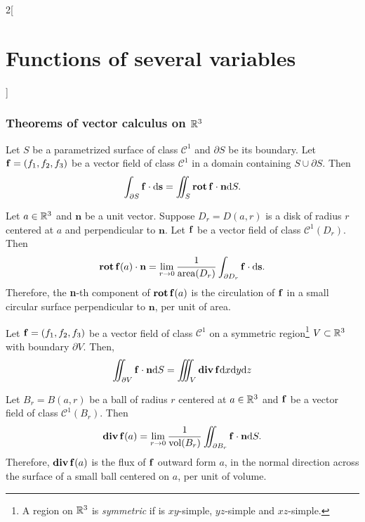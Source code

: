 \documentclass[../../../main.tex]{subfiles}
\begin{document}
\begin{multicols}{2}[\section{Functions of several variables}]
    \subsubsection*{Theorems of vector calculus on \texorpdfstring{$\mathbb{R}^3$}{R3}}
    \begin{theorem}
        Let $S$ be a parametrized surface of class $\mathcal{C}^1$ and $\partial S$ be its boundary. Let $\vb{f}=(f_1,f_2,f_3)$ be a vector field of class $\mathcal{C}^1$ in a domain containing $S\cup\partial S$. Then $$\int_{\partial S}\vb{f}\cdot \dd \textbf{s}=\iint_S\operatorname{\vb{rot}}\vb{f}\cdot\textbf{n} \dd S.$$
    \end{theorem}
    \begin{corollary}
        Let $a\in\mathbb{R}^3$ and $\textbf{n}$ be a unit vector. Suppose $D_r=D(a,r)$ is a disk of radius $r$ centered at $a$ and perpendicular to $\textbf{n}$. Let $\vb{f}$ be a vector field of class $\mathcal{C}^1(D_r)$. Then $$\operatorname{\vb{rot}}\vb{f}(a)\cdot\textbf{n}=\lim_{r\to 0}\frac{1}{\text{area}(D_r)}\int_{\partial D_r}\vb{f}\cdot \dd \textbf{s}.$$ Therefore, the \textbf{n}-th component of $\operatorname{\vb{rot}}\vb{f}(a)$ is the circulation of $\vb{f}$ in a small circular surface perpendicular to $\textbf{n}$, per unit of area.
    \end{corollary}
    \begin{theorem}
        Let $\vb{f}=(f_1,f_2,f_3)$ be a vector field of class $\mathcal{C}^1$ on a symmetric region\footnote{A region on $\mathbb{R}^3$ is \textit{symmetric} if is $xy$-simple, $yz$-simple and $xz$-simple.} $V\subset\mathbb{R}^3$ with boundary $\partial V$. Then, $$\iint_{\partial V}\vb{f}\cdot\textbf{n} \dd S=\iiint_V\operatorname{\vb{div}}\vb{f}\dd x\dd y\dd z$$
    \end{theorem}\pagebreak
    \begin{corollary}
        Let $B_r=B(a,r)$ be a ball of radius $r$ centered at $a\in\mathbb{R}^3$ and $\vb{f}$ be a vector field of class $\mathcal{C}^1(B_r)$. Then $$\operatorname{\vb{div}}\vb{f}(a)=\lim_{r\to 0}\frac{1}{\text{vol}(B_r)}\iint_{\partial B_r}\vb{f}\cdot\textbf{n} \dd S.$$ Therefore, $\operatorname{\vb{div}}\vb{f}(a)$ is the flux of $\vb{f}$ outward form $a$, in the normal direction across the surface of a small ball centered on $a$, per unit of volume.
    \end{corollary}
\end{multicols}
\end{document}
